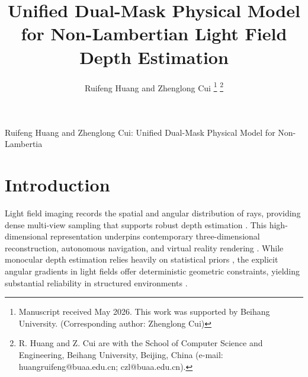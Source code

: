 \documentclass[lettersize,journal]{IEEEtran}
\begin{document}
\title{Unified Dual-Mask Physical Model for Non-Lambertian Light Field Depth Estimation}

\author{Ruifeng Huang and Zhenglong Cui
\thanks{Manuscript received May 2026. This work was supported by Beihang University. (Corresponding author: Zhenglong Cui)}
\thanks{R. Huang and Z. Cui are with the School of Computer Science and Engineering, Beihang University, Beijing, China (e-mail: huangruifeng@buaa.edu.cn; czl@buaa.edu.cn).}}

%
{Ruifeng Huang and Zhenglong Cui: Unified Dual-Mask Physical Model for Non-Lambertia}

\maketitle

\begin{abstract}

\end{abstract}

\begin{IEEEkeywords}

\end{IEEEkeywords}

\section{Introduction}

Light field imaging records the spatial and angular distribution of rays, providing dense multi-view sampling that supports robust depth estimation \cite{ng2005}. This high-dimensional representation underpins contemporary three-dimensional reconstruction, autonomous navigation, and virtual reality rendering \cite{ng2006}. While monocular depth estimation relies heavily on statistical priors \cite{eigen2014, godard2019}, the explicit angular gradients in light fields offer deterministic geometric constraints, yielding substantial reliability in structured environments \cite{honauer2016}.
\end{document}
